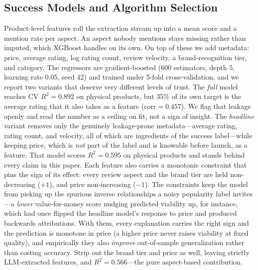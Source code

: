 \documentclass[journal]{IEEEtran}
\begin{document}
\subsection{Success Models and Algorithm Selection}
\label{sec:models}
Product-level features roll the extraction stream up into a mean score and a mention rate per aspect. An aspect nobody mentions stays missing rather than imputed, which XGBoost \cite{chen2016xgboost} handles on its own. On top of these we add metadata: price, average rating, log rating count, review velocity, a brand-recognition tier, and category. The regressors are gradient-boosted (600 estimators, depth 5, learning rate 0.05, seed 42) and trained under 5-fold cross-validation, and we report two variants that deserve very different levels of trust. The \emph{full} model reaches CV $R^2 = 0.892$ on physical products, but 35\% of its own target is the average rating that it also takes as a feature ($\text{corr} = 0.457$). We flag that leakage openly and read the number as a ceiling on fit, not a sign of insight. The \emph{headline} variant removes only the genuinely leakage-prone metadata---average rating, rating count, and velocity, all of which are ingredients of the success label---while keeping price, which is \emph{not} part of the label and is knowable before launch, as a feature. That model scores $R^2 = 0.595$ on physical products and stands behind every claim in this paper. Each feature also carries a monotonic constraint that pins the sign of its effect: every review aspect and the brand tier are held non-decreasing ($+1$), and price non-increasing ($-1$). The constraints keep the model from picking up the spurious inverse relationships a noisy popularity label invites---a \emph{lower} value-for-money score nudging predicted viability up, for instance, which had once flipped the headline model's response to price and produced backwards attributions. With them, every explanation carries the right sign and the prediction is monotone in price (a higher price never raises viability at fixed quality), and empirically they also \emph{improve} out-of-sample generalization rather than costing accuracy. Strip out the brand tier and price as well, leaving strictly LLM-extracted features, and $R^2 = 0.566$---the pure aspect-based contribution.
\end{document}
